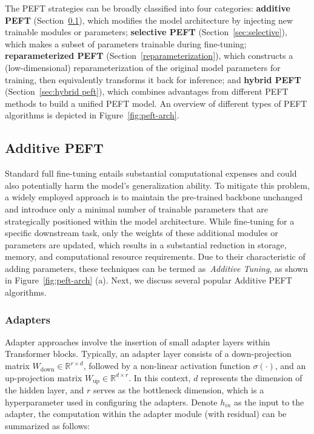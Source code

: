 The PEFT strategies can be broadly classified into four categories: \textbf{additive PEFT} (Section~\ref{sec:additive}), which modifies the model architecture by injecting new trainable modules or parameters; \textbf{selective PEFT} (Section~\ref{sec:selective}), which makes a subset of parameters trainable during fine-tuning; \textbf{reparameterized PEFT} (Section~\ref{reparameterization}), which constructs a (low-dimensional) reparameterization of the original model parameters for training, then equivalently transforms it back for inference; and \textbf{hybrid PEFT} (Section~\ref{sec:hybrid peft}), which combines advantages from different PEFT methods to build a unified PEFT model. An overview of different types of PEFT algorithms is depicted in Figure~\ref{fig:peft-arch}.




\subsection{Additive PEFT}
\label{sec:additive}

Standard full fine-tuning entails substantial computational expenses and could also potentially harm the model's 
generalization ability. To mitigate this problem, a widely employed approach is to maintain the pre-trained backbone unchanged and introduce only a minimal number of trainable parameters that are strategically positioned within the model architecture. While fine-tuning for a specific downstream task, only the weights of these additional modules or parameters are updated, which results in a substantial reduction in storage, memory, and computational resource requirements. Due to their characteristic of adding parameters, these techniques can be termed as~\textit{Additive Tuning}, as shown in Figure~\ref{fig:peft-arch} (a). Next, we discuss several popular Additive PEFT algorithms.

\subsubsection{Adapters}
\label{adaptertuning}
Adapter approaches involve the insertion of small adapter layers within Transformer blocks. Typically, an adapter layer consists of a down-projection matrix $W_{\text{down}} \in \mathbb{R}^{r \times d}$, followed by a non-linear activation function $\sigma(\cdot)$, and an up-projection matrix $W_{\text{up}} \in \mathbb{R}^{d \times r}$. In this context, $d$ represents the dimension of the hidden layer, and $r$ serves as the bottleneck dimension, which is a hyperparameter used in configuring the adapters. Denote $h_{in}$ as the input to the adapter, the computation within the adapter module (with residual) can be summarized as follows:

